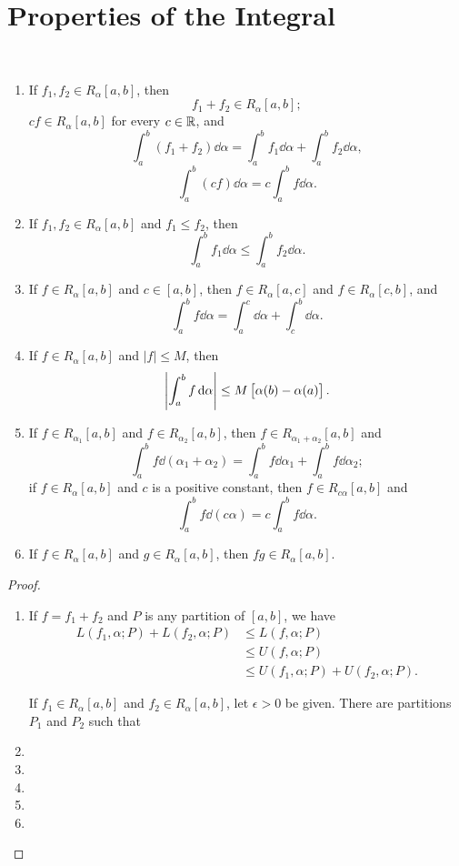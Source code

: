 \section{Properties of the Integral}
\begin{theorem} \
\begin{enumerate}[label=(\arabic*)]
\item If $f_1,f_2\in R_\alpha[a,b]$, then 
\[ f_1+f_2\in R_\alpha[a,b]; \]
$cf\in R_\alpha[a,b]$ for every $c\in\mathbb R$, and
\[ \int_a^b(f_1+f_2)\dd{\alpha}=\int_a^bf_1\dd{\alpha}+\int_a^bf_2\dd{\alpha}, \]
\[ \int_a^b(cf)\dd{\alpha}=c\int_a^bf\dd{\alpha}. \]

\item If $f_1,f_2\in R_\alpha[a,b]$ and $f_1\le f_2$, then
\[ \int_a^bf_1\dd{\alpha}\le\int_a^bf_2\dd{\alpha}. \]

\item If $f\in R_\alpha[a,b]$ and $c\in[a,b]$, then $f\in R_\alpha[a,c]$ and $f\in R_\alpha[c,b]$, and
\[ \int_a^bf\dd{\alpha}=\int_a^c\dd{\alpha}+\int_c^b\dd{\alpha}. \]

\item If $f\in R_\alpha[a,b]$ and $|f|\le M$, then
\[ \left|\int_a^bf\dd{\alpha}\right|\le M\left[\alpha(b)-\alpha(a)\right]. \]

\item If $f\in R_{\alpha_1}[a,b]$ and $f\in R_{\alpha_2}[a,b]$, then $f\in R_{\alpha_1+\alpha_2}[a,b]$ and
\[ \int_a^bf\dd{(\alpha_1+\alpha_2)}=\int_a^bf\dd{\alpha_1}+\int_a^bf\dd{\alpha_2}; \]
if $f\in R_\alpha[a,b]$ and $c$ is a positive constant, then $f\in R_{c\alpha}[a,b]$ and
\[ \int_a^bf\dd{(c\alpha)}=c\int_a^bf\dd{\alpha}. \]

\item If $f\in R_\alpha[a,b]$ and $g\in R_\alpha[a,b]$, then $fg\in R_\alpha[a,b]$.
\end{enumerate}
\end{theorem}

\begin{proof} \
\begin{enumerate}[label=(\arabic*)]
\item If $f=f_1+f_2$ and $P$ is any partition of $[a,b]$, we have
\begin{align*}
L(f_1,\alpha;P)+L(f_2,\alpha;P)&\le L(f,\alpha;P)\\
&\le U(f,\alpha;P)\\
&\le U(f_1,\alpha;P)+U(f_2,\alpha;P).
\end{align*}

If $f_1\in R_\alpha[a,b]$ and $f_2\in R_\alpha[a,b]$, let $\epsilon>0$ be given. There are partitions $P_1$ and $P_2$ such that


\item 
\item 
\item 
\item 
\item 
\end{enumerate}
\end{proof}

